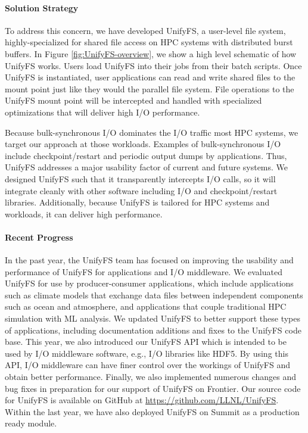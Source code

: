 \paragraph{Solution Strategy}

To address this concern, we have developed UnifyFS, a user-level file system,
highly-specialized for shared file access on HPC systems with distributed
burst buffers. In Figure \ref{fig:UnifyFS-overview}, we show a high
level schematic of how UnifyFS works. Users load UnifyFS into
their jobs from their batch scripts. Once UnifyFS is instantiated, user
applications can read and write shared files to the mount point just like
they would the parallel file system. File operations to the UnifyFS
mount point will be intercepted and handled with specialized optimizations
that will deliver high I/O performance.

Because bulk-synchronous I/O dominates the
I/O traffic most HPC systems, we target our approach at
those workloads. Examples of bulk-synchronous I/O include checkpoint/restart
and periodic output dumps by applications. Thus, UnifyFS  addresses a major usability
factor of current and future systems. We designed UnifyFS such
that it transparently intercepts I/O calls, so it will integrate
cleanly with other software including I/O and checkpoint/restart libraries.
Additionally, because UnifyFS is tailored for HPC systems and workloads,
it can deliver high performance.



\paragraph{Recent Progress}

In the past year, the UnifyFS team has focused on improving the usability
and performance of UnifyFS for applications and I/O middleware.
We evaluated UnifyFS for use by producer-consumer applications, which include
applications such as climate models that exchange data files between independent
components such as ocean and atmosphere, and applications that couple
traditional HPC simulation with ML analysis. We updated UnifyFS to better support
these types of applications, including documentation additions and fixes to the
UnifyFS code base. This year, we also introduced our UnifyFS API which is intended
to be used by I/O middleware software, e.g., I/O libraries like HDF5. By using this
API, I/O middleware can have finer control over the workings of UnifyFS and obtain
better performance. Finally, we also implemented numerous changes and bug fixes
in preparation for our support of UnifyFS on Frontier.
Our source code for UnifyFS is available on
GitHub at \url{https://github.com/LLNL/UnifyFS}. Within the last year, we have also deployed UnifyFS on Summit as a production ready module.

